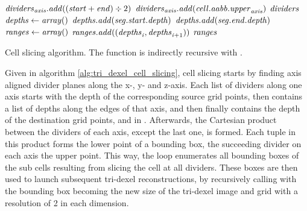 \begin{algorithm}
\begin{algorithmic}[1]
					\EndIf
				\EndFor
				\State $\mathit{dividers}_{\mathit{axis}}.\mathit{add}((\mathit{start} + \mathit{end}) \div 2)$
				\State $\mathit{dividers}_{\mathit{axis}}.\mathit{add}(\mathit{cell}.\mathit{aabb}.\mathit{upper}_{\mathit{axis}})$
			\EndFor
			\State \Return $\mathit{dividers}$
		\EndFunction
		\\
			\State $\mathit{depths} \gets \mathit{array}()$
					$\mathit{depths}.\mathit{add}(\mathit{seg}.\mathit{start}.\mathit{depth})$
				\EndIf
					$\mathit{depths}.\mathit{add}(\mathit{seg}.\mathit{end}.\mathit{depth})$
				\EndIf
			\EndFor
			\State $\mathit{ranges} \gets \mathit{array}()$
				\State $\mathit{ranges}.\mathit{add}((\mathit{depths}_{\mathit{i}}, \mathit{depths}_{\mathit{i} + 1}))$
			\EndFor
			\State \Return $\mathit{ranges}$
		\EndFunction
	\end{algorithmic}
	\caption{
		Cell slicing algorithm.
		The  function is indirectly recursive with .
	}
	\label{alg:tri_dexel_cell_slicing}
\end{algorithm}

Given in algorithm \ref{alg:tri_dexel_cell_slicing}, cell slicing starts by finding axis aligned divider planes along the x-, y- and z-axis.
Each list of dividers along one axis starts with the depth of the corresponding source grid points, then contains a list of depths along the edges of that axis, and then finally contains the depth of the destination grid points, \cf {} and  in .
Afterwards, the Cartesian product between the dividers of each axis, except the last one, is formed.
Each tuple in this product forms the lower point of a bounding box, the succeeding divider on each axis the upper point.
This way, the loop enumerates all bounding boxes of the sub cells resulting from slicing the cell at all dividers.
These boxes are then used to launch subsequent tri-dexel reconstructions, by recursively calling  with the bounding box becoming the new size of the tri-dexel image and grid with a resolution of 2 in each dimension.

